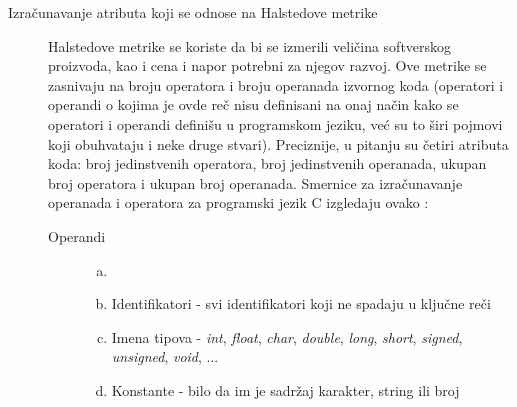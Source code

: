 \documentclass[12pt,oneside]{memoir}
\begin{document}
\begin{description}
\item[Izračunavanje atributa koji se odnose na Halstedove metrike]

Halstedove metrike se koriste da bi se izmerili veličina softverskog proizvoda, kao i cena i napor potrebni za njegov razvoj. Ove metrike se zasnivaju na broju operatora i broju operanada izvornog koda (operatori i operandi o kojima je ovde reč nisu definisani na onaj način kako se operatori i operandi definišu u programskom jeziku, već su to širi pojmovi koji obuhvataju i neke druge stvari). Preciznije, u pitanju su četiri atributa koda: broj jedinstvenih operatora, broj jedinstvenih operanada, ukupan broj operatora i ukupan broj operanada.  Smernice za izračunavanje operanada i operatora za programski jezik C izgledaju ovako \cite{halstead}:
\begin{description}
\item[Operandi]
	\begin{enumerate}[(a)]
		\item[]
		\item Identifikatori - svi identifikatori koji ne spadaju u ključne reči
		\item Imena tipova - \textit{int}, \textit{float}, \textit{char}, \textit{double}, \textit{long}, \textit{short}, \textit{signed}, \textit{unsigned}, \textit{void}, ... 
		\item Konstante - bilo da im je sadržaj karakter, string ili broj
	\end{enumerate}


\end{description}
\end{description}
\end{document}
